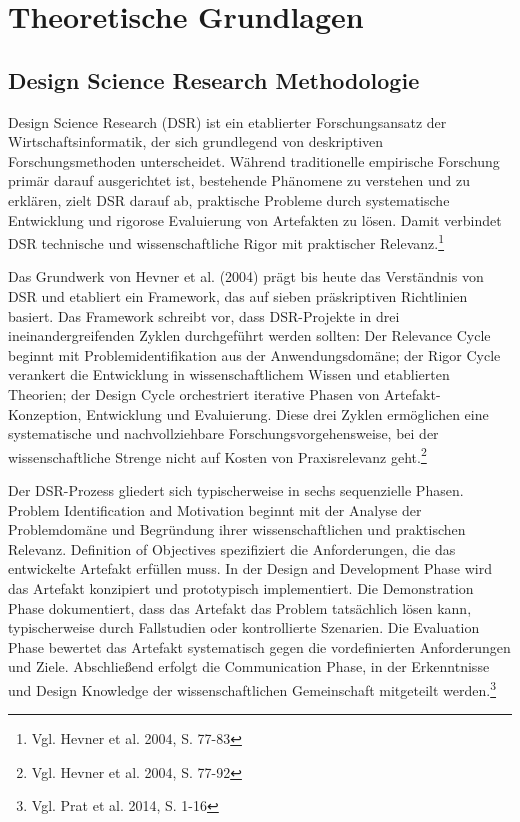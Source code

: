 \chapter{Theoretische Grundlagen}

\section{Design Science Research Methodologie}

Design Science Research (DSR) ist ein etablierter Forschungsansatz der Wirtschaftsinformatik, der sich grundlegend von deskriptiven Forschungsmethoden unterscheidet. Während traditionelle empirische Forschung primär darauf ausgerichtet ist, bestehende Phänomene zu verstehen und zu erklären, zielt DSR darauf ab, praktische Probleme durch systematische Entwicklung und rigorose Evaluierung von Artefakten zu lösen. Damit verbindet DSR technische und wissenschaftliche Rigor mit praktischer Relevanz.\footnote{Vgl. Hevner et al. 2004, S. 77-83}

Das Grundwerk von Hevner et al. (2004) prägt bis heute das Verständnis von DSR und etabliert ein Framework, das auf sieben präskriptiven Richtlinien basiert. Das Framework schreibt vor, dass DSR-Projekte in drei ineinandergreifenden Zyklen durchgeführt werden sollten: Der Relevance Cycle beginnt mit Problemidentifikation aus der Anwendungsdomäne; der Rigor Cycle verankert die Entwicklung in wissenschaftlichem Wissen und etablierten Theorien; der Design Cycle orchestriert iterative Phasen von Artefakt-Konzeption, Entwicklung und Evaluierung. Diese drei Zyklen ermöglichen eine systematische und nachvollziehbare Forschungsvorgehensweise, bei der wissenschaftliche Strenge nicht auf Kosten von Praxisrelevanz geht.\footnote{Vgl. Hevner et al. 2004, S. 77-92}

Der DSR-Prozess gliedert sich typischerweise in sechs sequenzielle Phasen. Problem Identification and Motivation beginnt mit der Analyse der Problemdomäne und Begründung ihrer wissenschaftlichen und praktischen Relevanz. Definition of Objectives spezifiziert die Anforderungen, die das entwickelte Artefakt erfüllen muss. In der Design and Development Phase wird das Artefakt konzipiert und prototypisch implementiert. Die Demonstration Phase dokumentiert, dass das Artefakt das Problem tatsächlich lösen kann, typischerweise durch Fallstudien oder kontrollierte Szenarien. Die Evaluation Phase bewertet das Artefakt systematisch gegen die vordefinierten Anforderungen und Ziele. Abschließend erfolgt die Communication Phase, in der Erkenntnisse und Design Knowledge der wissenschaftlichen Gemeinschaft mitgeteilt werden.\footnote{Vgl. Prat et al. 2014, S. 1-16}

